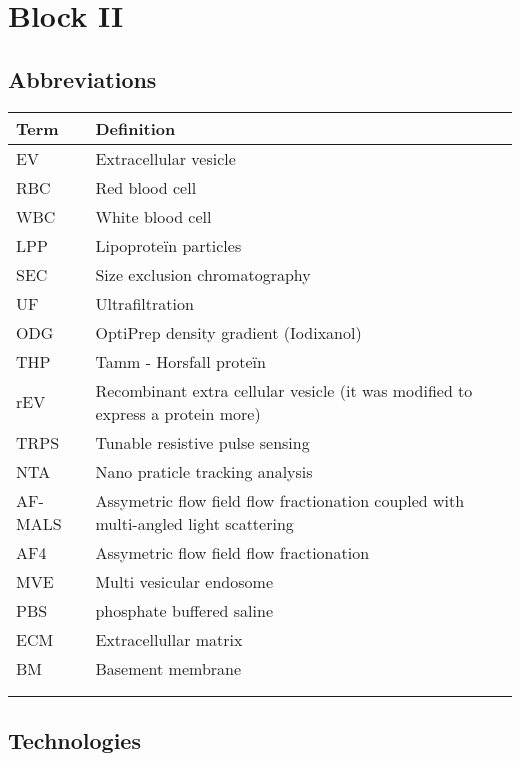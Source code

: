 \documentclass{article}
\begin{document}
\section{Block II}

\subsection{Abbreviations}

\begin{table}[h]
\begin{tabular}{|l|l|}
\hline
\textbf{Term} & \textbf{Definition} \\ \hline
EV & Extracellular vesicle \\ \hline
RBC & Red blood cell \\ \hline
WBC & White blood cell \\ \hline
LPP & Lipoproteïn particles \\ \hline
SEC & Size exclusion chromatography \\ \hline
UF & Ultrafiltration \\ \hline
ODG & OptiPrep density gradient (Iodixanol) \\ \hline
THP & Tamm - Horsfall proteïn \\ \hline
rEV & Recombinant extra cellular vesicle (it was modified to express a protein more) \\ \hline
TRPS & Tunable resistive pulse sensing \\ \hline
NTA & Nano praticle tracking analysis \\ \hline
AF-MALS & Assymetric flow field flow fractionation coupled with multi-angled light scattering \\ \hline
AF4 & Assymetric flow field flow fractionation \\ \hline
MVE & Multi vesicular endosome  \\ \hline
PBS & phosphate buffered saline \\ \hline
ECM & Extracellullar matrix \\ \hline
BM & Basement membrane \\ \hline
 &  \\ \hline
 &  \\ \hline
      

\end{tabular}
\end{table}

\subsection{Technologies}
\end{document}

